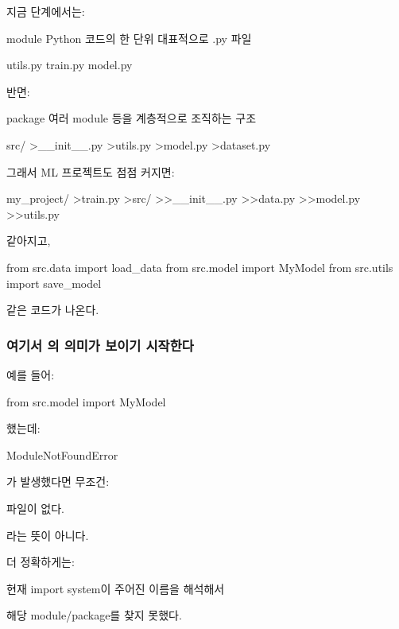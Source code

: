 지금 단계에서는:

\begin{dhksmry}[centered]
module
\da
Python 코드의 한 단위
대표적으로 .py 파일

utils.py
train.py
model.py
\end{dhksmry}

반면:

\begin{dhksmry}[centered]
package
\da
여러 module 등을 계층적으로 조직하는 구조
\end{dhksmry}

\begin{dhkdir}
src/
>__init__.py
>utils.py
>model.py
>dataset.py
\end{dhkdir}

그래서 ML 프로젝트도 점점 커지면:

\begin{dhkdir}
my_project/
>train.py
>src/
>>__init__.py
>>data.py
>>model.py
>>utils.py
\end{dhkdir}

같아지고,

\begin{dhkcode}
from src.data import load_data
from src.model import MyModel
from src.utils import save_model
\end{dhkcode}

같은 코드가 나온다.

\subsubsection{여기서 의 의미가 보이기 시작한다}

예를 들어:

\begin{dhkcode}
from src.model import MyModel
\end{dhkcode}

했는데:

\begin{dhkzsh}
ModuleNotFoundError
\end{dhkzsh}

가 발생했다면 무조건:

\begin{dhksmry}[centered]
파일이 없다.
\end{dhksmry}

라는 뜻이 아니다.

더 정확하게는:

\begin{dhknote}
\begin{dhksmry}[centered]
현재 import system이 주어진 이름을 해석해서

해당 module/package를 찾지 못했다.
\end{dhksmry}
\end{dhknote}

